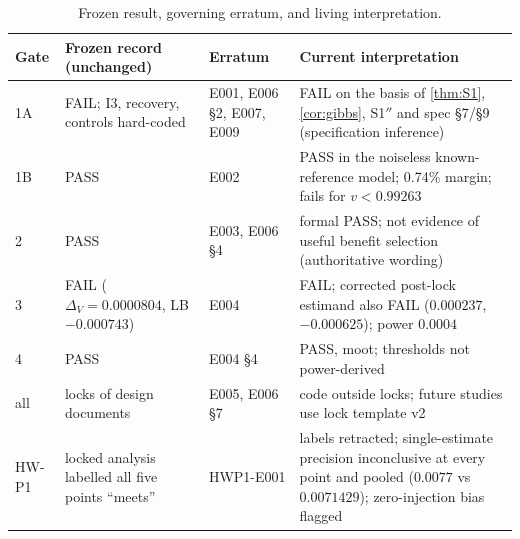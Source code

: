 \documentclass[10pt,twocolumn]{article}
\theoremstyle{definition}
\theoremstyle{remark}
\newcommand{\DV}{\Delta_V}
\begin{document}
\begin{table}[h]
\centering\small
\caption{Frozen result, governing erratum, and living interpretation.}\label{tab:frozen}
\begin{tabularx}{\textwidth}{@{}l>{\raggedright\arraybackslash}X>{\raggedright\arraybackslash}X>{\raggedright\arraybackslash}X@{}}
\toprule
Gate & Frozen record (unchanged) & Erratum & Current interpretation \\
\midrule
1A & FAIL; I3, recovery, controls hard-coded & E001, E006 §2, E007, E009 & FAIL on the basis of \cref{thm:S1}, \cref{cor:gibbs}, S1$''$ and spec §7/§9 (specification inference) \\
1B & PASS & E002 & PASS in the noiseless known-reference model; 0.74\% margin; fails for $v<0.99263$ \\
2 & PASS & E003, E006 §4 & formal PASS; not evidence of useful benefit selection (authoritative wording) \\
3 & FAIL ($\DV=0.0000804$, LB $-0.000743$) & E004 & FAIL; corrected post-lock estimand also FAIL ($0.000237$, $-0.000625$); power $0.0004$ \\
4 & PASS & E004 §4 & PASS, moot; thresholds not power-derived \\
all & locks of design documents & E005, E006 §7 & code outside locks; future studies use lock template v2 \\
HW-P1 & locked analysis labelled all five points ``meets'' & HWP1-E001 & labels retracted; single-estimate precision inconclusive at every point and pooled ($0.0077$ vs $0.0071429$); zero-injection bias flagged \\
\bottomrule
\end{tabularx}
\end{table}
\end{document}
